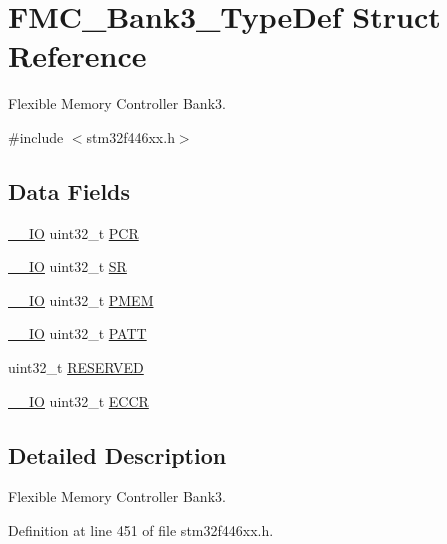 \hypertarget{struct_f_m_c___bank3___type_def}{}\section{F\+M\+C\+\_\+\+Bank3\+\_\+\+Type\+Def Struct Reference}
\label{struct_f_m_c___bank3___type_def}


Flexible Memory Controller Bank3.  




{\ttfamily \#include $<$stm32f446xx.\+h$>$}

\subsection*{Data Fields}
\begin{DoxyCompactItemize}
\item 
\hyperlink{core__sc300_8h_aec43007d9998a0a0e01faede4133d6be}{\+\_\+\+\_\+\+IO} uint32\+\_\+t \hyperlink{struct_f_m_c___bank3___type_def_a6091bd215b74df162dd3bc51621c63ca}{P\+CR}
\item 
\hyperlink{core__sc300_8h_aec43007d9998a0a0e01faede4133d6be}{\+\_\+\+\_\+\+IO} uint32\+\_\+t \hyperlink{struct_f_m_c___bank3___type_def_af6aca2bbd40c0fb6df7c3aebe224a360}{SR}
\item 
\hyperlink{core__sc300_8h_aec43007d9998a0a0e01faede4133d6be}{\+\_\+\+\_\+\+IO} uint32\+\_\+t \hyperlink{struct_f_m_c___bank3___type_def_a64620060ab9533cea56d1c6049fbd612}{P\+M\+EM}
\item 
\hyperlink{core__sc300_8h_aec43007d9998a0a0e01faede4133d6be}{\+\_\+\+\_\+\+IO} uint32\+\_\+t \hyperlink{struct_f_m_c___bank3___type_def_ae95cf98e0ba3414c3d66385b677fcbf1}{P\+A\+TT}
\item 
uint32\+\_\+t \hyperlink{struct_f_m_c___bank3___type_def_a0e5030971ec1bfd3101f83f546493c83}{R\+E\+S\+E\+R\+V\+ED}
\item 
\hyperlink{core__sc300_8h_aec43007d9998a0a0e01faede4133d6be}{\+\_\+\+\_\+\+IO} uint32\+\_\+t \hyperlink{struct_f_m_c___bank3___type_def_abe203f827d2e33c7f162e4170b6dfdb3}{E\+C\+CR}
\end{DoxyCompactItemize}


\subsection{Detailed Description}
Flexible Memory Controller Bank3. 

Definition at line 451 of file stm32f446xx.\+h.



